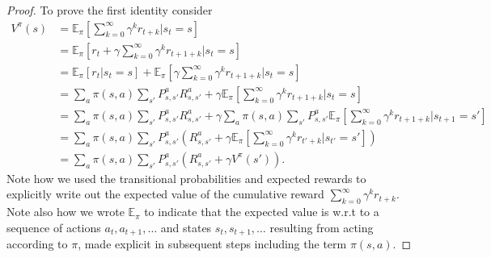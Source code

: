\documentclass[11pt]{article} %
\begin{document}
\begin{proof}
	To prove the first identity consider
	\[
		\begin{array}{rl}
			V^{\pi}(s)		& = \mathbb{E}_{\pi}[ \sum_{k=0}^{\infty} \gamma^k r_{t+k} | s_t = s]  \\
						& = \mathbb{E}_{\pi}[r_t + \gamma \sum_{k=0}^{\infty} \gamma^k r_{t+1+k} | s_t = s]  \\
						& = \mathbb{E}_{\pi}[r_t | s_t = s] + \mathbb{E}_{\pi}[\gamma \sum_{k=0}^{\infty} \gamma^k r_{t+1+k} | s_t = s] \\
						& = \sum_a \pi(s,a) \sum_{s'} P_{s,s'}^a R_{s,s'}^a + \gamma \mathbb{E}_{\pi}[\sum_{k=0}^{\infty} \gamma^k r_{t+1+k} | s_t = s] \\
						& = \sum_a \pi(s,a) \sum_{s'} P_{s,s'}^a R_{s,s'}^a + \gamma \sum_a \pi(s,a) \sum_{s'} P_{s,s'}^a \mathbb{E}_{\pi} [\sum_{k=0}^{\infty} \gamma^k r_{t+1+k} | s_{t+1} = s'] \\
						& = \sum_a \pi(s,a) \sum_{s'} P_{s,s'}^a (R_{s,s'}^a + \gamma \mathbb{E}_{\pi}[\sum_{k=0}^{\infty} \gamma^k r_{t'+k} | s_{t'} = s'] ) \\
						& = \sum_a \pi(s,a) \sum_{s'} P_{s,s'}^a (R_{s,s'}^a + \gamma V^{\pi}(s') ).
		\end{array}
	\]
	Note how we used the transitional probabilities and expected rewards to explicitly write out the expected value of the cumulative reward $\sum_{k=0}		^{\infty} \gamma^k r_{t+k}$. Note also how we wrote $\mathbb{E}_{\pi}$ to indicate that the expected value is w.r.t to a sequence of actions $a_t, a_{t+1},\dots$ and states $s_t,s_{t+1},\dots$ resulting from acting according to $\pi$, made explicit in subsequent steps including the term $\pi(s,a)$.


\end{proof}
\end{document}
